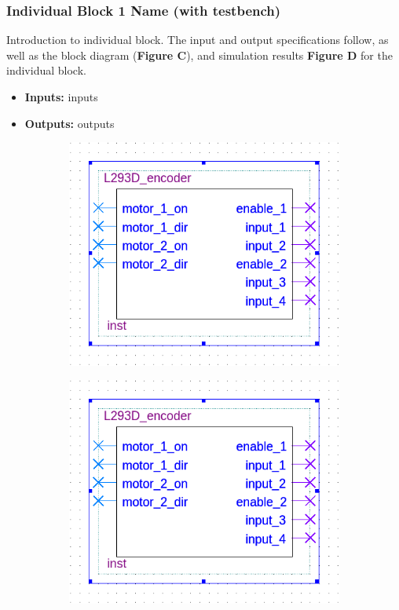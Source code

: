\documentclass[a4paper]{article}
\begin{document}
\clearpage



\subsubsection{Individual Block 1 Name (with testbench)}
Introduction to individual block. The input and output specifications follow, as well as the block diagram (\textbf{Figure C}), and simulation results \textbf{Figure D} for the individual block.
\begin{itemize}
  \item \textbf{Inputs:  } inputs
  \item \textbf{Outputs: } outputs
\end{itemize}
\begin{figure}[h]
  \centering
  \begin{subfigure}[t]{.4\textwidth}
    \includegraphics[width=.98\textwidth]{symbols/individual_placeholder.png}
	\end{subfigure}
  \begin{subfigure}[t]{.4\textwidth}
  \includegraphics[width=.98\textwidth]{symbols/individual_placeholder.png}

\end{subfigure}
\end{figure}
\end{document}

